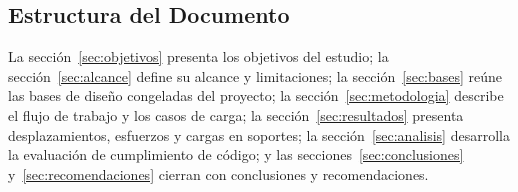 \subsection{Estructura del Documento}

La secci\'{o}n~\ref{sec:objetivos} presenta los objetivos del estudio; la
secci\'{o}n~\ref{sec:alcance} define su alcance y limitaciones; la
secci\'{o}n~\ref{sec:bases} re\'{u}ne las bases de dise\~{n}o congeladas del
proyecto; la secci\'{o}n~\ref{sec:metodologia} describe el flujo de trabajo y
los casos de carga; la secci\'{o}n~\ref{sec:resultados} presenta
desplazamientos, esfuerzos y cargas en soportes; la
secci\'{o}n~\ref{sec:analisis} desarrolla la evaluaci\'{o}n de cumplimiento de
c\'{o}digo; y las secciones~\ref{sec:conclusiones} y~\ref{sec:recomendaciones}
cierran con conclusiones y recomendaciones.
